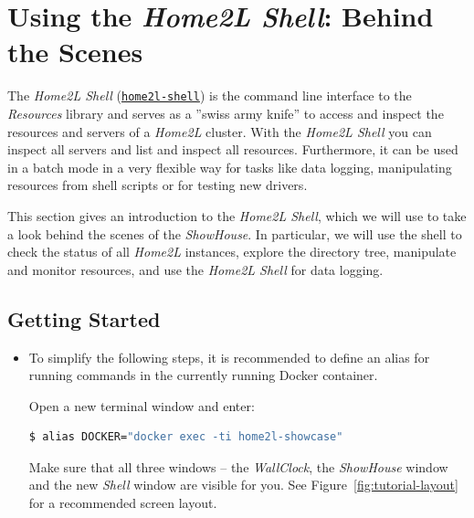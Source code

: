 \documentclass[12pt,english,parskip=half,headheight=19pt]{scrreprt}
\newcommand{\idx}[1]{#1\index{#1}}
\newcommand{\reftool}[1]{\hyperref[tool:#1]{\texttt{\idx{#1}}}}
\begin{document}
\clearpage
\section{Using the \textit{Home2L Shell}: Behind the Scenes}
\label{sec:tutorial-shell}


The \textit{Home2L Shell} (\reftool{home2l-shell}) is the command line interface to the \textit{Resources} library and serves as a ''swiss army knife'' to access and inspect the resources and servers of a \textit{Home2L} cluster. With the \textit{Home2L Shell} you can inspect all servers and list and inspect all resources. Furthermore, it can be used in a batch mode in a very flexible way for tasks like data logging, manipulating resources from shell scripts or for testing new drivers.

This section gives an introduction to the \textit{Home2L Shell}, which we will use to take a look behind the scenes of the \textit{ShowHouse}. In particular, we will use the shell to check the status of all \textit{Home2L} instances, explore the directory tree, manipulate and monitor resources, and use the \textit{Home2L Shell} for data logging.





\subsection{Getting Started}
\label{sec:tutorial-shell-start}



\begin{itemize}[$\blacktriangleright$]

\item
  To simplify the following steps, it is recommended to define an alias for running
  commands in the currently running Docker container.

  Open a new terminal window and enter:
  \begin{lstlisting}[language=bash]
    $ alias DOCKER="docker exec -ti home2l-showcase"
  \end{lstlisting}
  Make sure that all three windows -- the \textit{WallClock}, the \textit{ShowHouse} window and
  the new \textit{Shell} window are visible for you. See Figure~\ref{fig:tutorial-layout} for
  a recommended screen layout.

\end{itemize}
\end{document}
